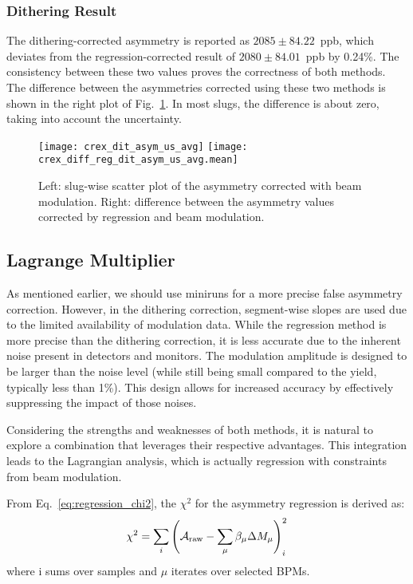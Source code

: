 \subsubsection{Dithering Result}
The dithering-corrected asymmetry is reported as $2085 \pm 84.22$~ppb, which deviates
from the regression-corrected result of $2080 \pm 84.01$~ppb by 0.24\%.
The consistency between these two values proves the correctness of both methods. 
The difference between the asymmetries corrected using these two methods
is shown in the right plot of Fig.~\ref{fig:dit_result}. In most slugs, the difference
is about zero, taking into account the uncertainty.
\begin{figure}[H]
    \centering
    \texttt{[image: crex\_dit\_asym\_us\_avg]}
    \texttt{[image: crex\_diff\_reg\_dit\_asym\_us\_avg.mean]}
    \caption[Dithering corrected asymmetry]
    {Left: slug-wise scatter plot of the asymmetry corrected with beam modulation.
    Right: difference between the asymmetry values corrected by regression and
    beam modulation.}
    \label{fig:dit_result}
\end{figure}


\subsection{Lagrange Multiplier}
As mentioned earlier, we should use miniruns for a more precise false asymmetry correction.
However, in the dithering correction, segment-wise slopes are used due to the limited
availability of modulation data. While the regression method is more precise than the dithering correction, it is less accurate due to the inherent noise present in detectors and monitors.
The modulation amplitude is designed to be larger than the noise level (while still being small compared to the yield, typically less than 1\%). This design allows for increased accuracy by effectively suppressing the impact of those noises.

Considering the strengths and weaknesses of both methods, it is natural to 
explore a combination that leverages their respective advantages. This integration
leads to the Lagrangian analysis, which is actually regression with constraints from beam modulation.

From Eq.~\ref{eq:regression_chi2}, the $\chi^2$ for the asymmetry regression is
derived as:
\begin{equation}
    \chi^2 = \sum_i \left( \mathcal{A}_{\text{raw}} - \sum_\mu \beta_\mu \Delta M_\mu \right)_i^2
\end{equation}
where i sums over samples and $\mu$ iterates over selected BPMs.

